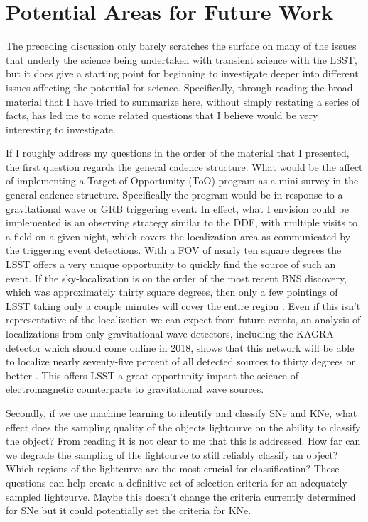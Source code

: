 \documentclass[12pt]{article}
\begin{document}
\section{Potential Areas for Future Work} %
The preceding discussion only barely scratches the surface on many of the issues that underly the science being undertaken with transient science with the LSST, but it does give a starting point for beginning to investigate deeper into different issues affecting the potential for science. Specifically, through reading the broad material that I have tried to summarize here, without simply restating a series of facts, has led me to some related questions that I believe would be very interesting to investigate. \par
If I roughly address my questions in the order of the material that I presented, the first question regards the general cadence structure. What would be the affect of implementing a Target of Opportunity (ToO) program as a mini-survey in the general cadence structure. Specifically the program would be in response to a gravitational wave or GRB triggering event. In effect, what I envision could be implemented is an observing strategy similar to the DDF, with multiple visits to a field on a given night, which covers the localization area as communicated by the triggering event detections. With a FOV of nearly ten square degrees the LSST offers a very unique opportunity to quickly find the source of such an event. If the sky-localization is on the order of the most recent BNS discovery, which was approximately thirty square degrees, then only a few pointings of LSST taking only a couple minutes will cover the entire region \citep{Kasliwal2017}. Even if this isn't representative of the localization we can expect from future events, an analysis of localizations from only gravitational wave detectors, including the KAGRA detector which should come online in 2018, shows that this network will be able to localize nearly seventy-five percent of all detected sources to thirty degrees or better \citep{Fairhurst2014}. This offers LSST a great opportunity impact the science of electromagnetic counterparts to gravitational wave sources.\par
Secondly, if we use machine learning to identify and classify SNe and KNe, what effect does the sampling quality of the objects lightcurve on the ability to classify the object? From reading \cite{Lochner2016} it is not clear to me that this is addressed. How far can we degrade the sampling of the lightcurve to still reliably classify an object? Which regions of the lightcurve are the most crucial for classification? These questions can help create a definitive set of selection criteria for an adequately sampled lightcurve. Maybe this doesn't change the criteria currently determined for SNe but it could potentially set the criteria for KNe.\par
\end{document}
